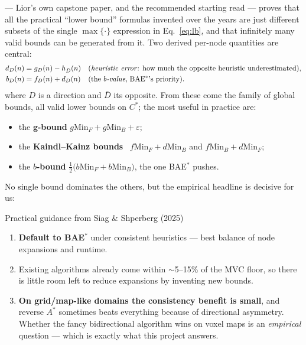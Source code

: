 \documentclass[11pt]{article}
\newcommand{\Cstar}{C^{*}}
\begin{document}
\citet{siag2025bridging} --- Lior's own capstone paper, and the recommended starting read
--- proves that all the practical ``lower bound'' formulas invented over the years are just
different subsets of the single $\max\{\cdot\}$ expression in Eq.~\eqref{eq:lb}, and that
infinitely many valid bounds can be generated from it. Two derived per-node quantities are
central:
\begin{align}
  d_D(n) &= g_D(n)-h_{\bar D}(n) && \text{(\emph{heuristic error}: how much the opposite
                                     heuristic underestimated),}\\
  b_D(n) &= f_D(n)+d_D(n)        && \text{(the \emph{$b$-value}, BAE$^{*}$'s priority).}
\end{align}
where $D$ is a direction and $\bar D$ its opposite. From these come the family of global
bounds, all valid lower bounds on $\Cstar$; the most useful in practice are:
\begin{itemize}[leftmargin=1.4em,itemsep=1pt]
  \item the \textbf{g-bound} $g\mathrm{Min}_F+g\mathrm{Min}_B+\varepsilon$;
  \item the \textbf{Kaindl--Kainz bounds}~\citep{kaindl1997reconsidered}
        $f\mathrm{Min}_F+d\mathrm{Min}_B$ and $f\mathrm{Min}_B+d\mathrm{Min}_F$;
  \item the \textbf{$b$-bound} $\tfrac12\bigl(b\mathrm{Min}_F+b\mathrm{Min}_B\bigr)$,
        the one BAE$^{*}$ pushes.
\end{itemize}
No single bound dominates the others, but the empirical headline is decisive for us:

\begin{keybox}{Practical guidance from Siag \& Shperberg (2025)}
\begin{enumerate}[leftmargin=1.3em,itemsep=1pt]
  \item \textbf{Default to BAE$^{*}$} under consistent heuristics --- best balance of node
        expansions and runtime.
  \item Existing algorithms already come within $\sim$5--15\% of the MVC floor, so there is
        little room left to reduce expansions by inventing new bounds.
  \item \textbf{On grid/map-like domains the consistency benefit is small}, and reverse
        $A^{*}$ sometimes beats everything because of directional asymmetry. Whether the
        fancy bidirectional algorithm wins on voxel maps is an \emph{empirical} question ---
        which is exactly what this project answers.
\end{enumerate}
\end{keybox}
\end{document}
